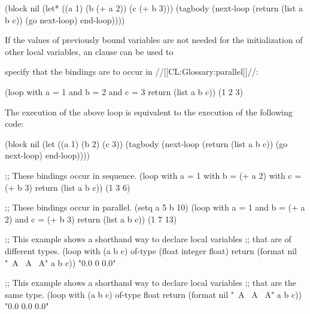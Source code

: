 
\code
 (block nil
   (let* ((a 1)
          (b (+ a 2))
          (c (+ b 3)))
     (tagbody
         (next-loop (return (list a b c))
                    (go next-loop)
                    end-loop))))
\endcode


If the values of previously bound variables are not needed
for the initialization of other local variables, an 
 clause can be used to 


specify that the bindings are to occur in //[[CL:Glossary:parallel]]//:
 
\code
 (loop with a = 1 
       and b = 2 
       and c = 3
       return (list a b c))
\EV (1 2 3)
\endcode
 
The execution of the above loop is equivalent to the execution of
the following code:
 

\code
 (block nil
   (let ((a 1)
         (b 2)
         (c 3))
     (tagbody
         (next-loop (return (list a b c))
                    (go next-loop)
                    end-loop))))
\endcode



\code
;; These bindings occur in sequence.
 (loop with a = 1 
       with b = (+ a 2) 
       with c = (+ b 3)
       return (list a b c))
\EV (1 3 6)
 
;; These bindings occur in parallel.
 (setq a 5 b 10)
 (loop with a = 1
       and b = (+ a 2)
       and c = (+ b 3)
       return (list a b c))
\EV (1 7 13)
 
;; This example shows a shorthand way to declare local variables 
;; that are of different types.
 (loop with (a b c) of-type (float integer float)
       return (format nil "~A ~A ~A" a b c))
\EV "0.0 0 0.0"
 
;; This example shows a shorthand way to declare local variables 
;; that are the same type.
 (loop with (a b c) of-type float 
       return (format nil "~A ~A ~A" a b c))
\EV "0.0 0.0 0.0"
\endcode

\endsubsubsubsection%

\endsubsubsection%

\endsubsection%

 




